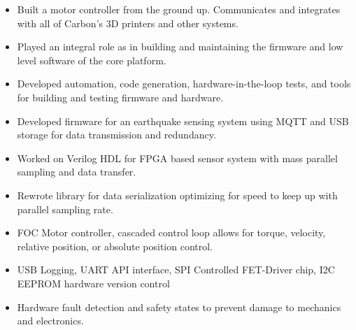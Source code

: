\documentclass[10pt,a4paper,ragged2e,withhyper]{altacv}
\begin{document}


\makecvheader


\begin{paracol}{2}

\begin{itemize}
\item Built a motor controller from the ground up. Communicates and integrates with all of Carbon's 3D printers and other systems.
\item Played an integral role as in building and maintaining the firmware and low level software of the core platform.
\item Developed automation, code generation, hardware-in-the-loop tests, and tools for building and testing firmware and hardware.
\end{itemize}

\divider

\begin{itemize}
\item Developed firmware for an earthquake sensing system using MQTT and USB storage for data transmission and redundancy.
\item Worked on Verilog HDL for FPGA based sensor system with mass parallel sampling and data transfer.
\item Rewrote library for data serialization optimizing for speed to keep up with parallel sampling rate.
\end{itemize}


\begin{itemize}
\item FOC Motor controller, cascaded control loop allows for torque, velocity, relative position, or absolute position control.
\item USB Logging, UART API interface, SPI Controlled FET-Driver chip, I2C EEPROM hardware version control
\item Hardware fault detection and safety states to prevent damage to mechanics and electronics.
\end{itemize}


\end{paracol}
\end{document}

